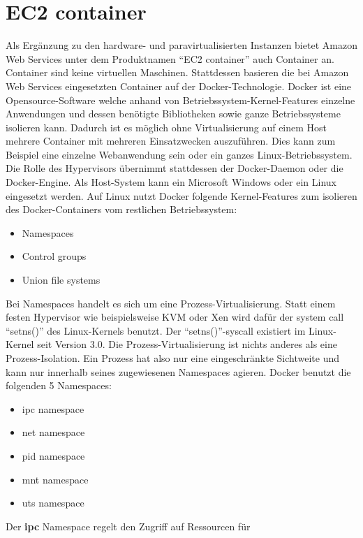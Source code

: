 \documentclass[titlepage]{report}
\begin{document}
\section*{EC2 container}
Als Ergänzung zu den hardware\hyp{} und paravirtualisierten Instanzen
bietet Amazon Web Services unter dem Produktnamen ``EC2 container'' auch
Container an. Container sind keine virtuellen Maschinen. Stattdessen
basieren die bei Amazon Web Services eingesetzten Container auf der
Docker\hyp{}Technologie. Docker ist eine Opensource\hyp{}Software welche
anhand von Betriebssystem\hyp{}Kernel\hyp{}Features einzelne Anwendungen
und dessen benötigte Bibliotheken sowie ganze Betriebssysteme isolieren
kann. Dadurch ist es möglich ohne Virtualisierung auf einem Host mehrere
Container mit mehreren Einsatzwecken auszuführen. Dies kann zum Beispiel
eine einzelne Webanwendung sein oder ein ganzes Linux-Betriebssystem.
Die Rolle des Hypervisors übernimmt stattdessen der Docker\hyp{}Daemon oder
die Docker\hyp{}Engine. Als Host\hyp{}System kann ein Microsoft Windows
oder ein Linux eingesetzt werden. Auf Linux nutzt Docker folgende
Kernel\hyp{}Features zum isolieren des Docker\hyp{}Containers vom
restlichen Betriebssystem:
\begin{itemize}
    \item Namespaces
    \item Control groups
    \item Union file systems
\end{itemize}
Bei Namespaces handelt es sich um eine Prozess\hyp{}Virtualisierung.
Statt einem festen Hypervisor wie beispielsweise KVM oder Xen wird dafür
der system call ``setns()'' des Linux\hyp{}Kernels benutzt. Der
``setns()''\hyp{}syscall existiert im Linux\hyp{}Kernel seit Version
3.0.\cite{setns} Die Prozess\hyp{}Virtualisierung ist nichts anderes als
eine Prozess\hyp{}Isolation. Ein Prozess hat also nur eine eingeschränkte
Sichtweite und kann nur innerhalb seines zugewiesenen Namespaces
agieren. Docker benutzt die folgenden 5 Namespaces:\cite{docker}
\begin{itemize}
    \item ipc namespace
    \item net namespace
    \item pid namespace
    \item mnt namespace
    \item uts namespace
\end{itemize}
Der \textbf{ipc} Namespace regelt den Zugriff auf Ressourcen für
\end{document}
